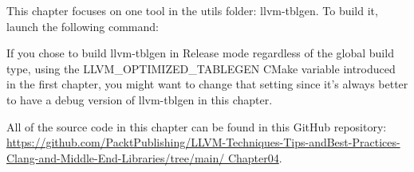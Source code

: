 This chapter focuses on one tool in the utils folder: llvm-tblgen. To build it, launch the following command:


\begin{tcolorbox}[colback=blue!5!white,colframe=blue!75!black, fonttitle=\bfseries,title=Note]
\hspace*{0.7cm}If you chose to build llvm-tblgen in Release mode regardless of the global build type, using the LLVM\_OPTIMIZED\_TABLEGEN CMake variable introduced in the first chapter, you might want to change that setting since it's always better to have a debug version of llvm-tblgen in this chapter.
\end{tcolorbox}

All of the source code in this chapter can be found in this GitHub repository: \url{https://github.com/PacktPublishing/LLVM-Techniques-Tips-andBest-Practices-Clang-and-Middle-End-Libraries/tree/main/
Chapter04}.
















